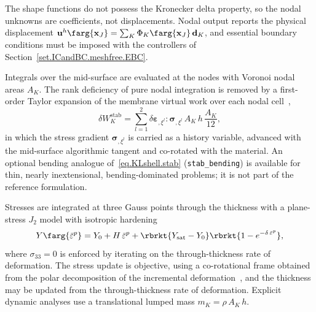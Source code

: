 The shape functions do not possess the Kronecker delta property, so the nodal unknowns are
coefficients, not displacements. Nodal output reports the physical displacement
$\mathbf{u}^{h}\farg{\mathbf{x}_{J}}=\sum_{K}\Phi_{K}\farg{\mathbf{x}_{J}}\,\mathbf{d}_{K}$,
and essential boundary conditions must be imposed with the controllers of
Section~\ref{set.ICandBC.meshfree.EBC}.

Integrals over the mid-surface are evaluated at the nodes with Voronoi nodal areas $A_{K}$. The
rank deficiency of pure nodal integration is removed by a first-order Taylor expansion of the
membrane virtual work over each nodal cell~\cite{WangBazilevs2025,Hillman2016},
\begin{equation}
\label{eq.KLshell.stab}
\delta W_{K}^{\textrm{stab}} = \sum_{l=1}^{2}
   \delta\boldsymbol{\varepsilon}_{,\xi^{l}} : \boldsymbol{\sigma}_{,\xi^{l}}\,
   A_{K}\,h\,\frac{A_{K}}{12},
\end{equation}
in which the stress gradient $\boldsymbol{\sigma}_{,\xi^{l}}$ is carried as a history variable,
advanced with the mid-surface algorithmic tangent and co-rotated with the material. An optional
bending analogue of~\eqref{eq.KLshell.stab} (\texttt{stab\_bending}) is available for thin,
nearly inextensional, bending-dominated problems; it is not part of the reference formulation.

Stresses are integrated at three Gauss points through the thickness with a plane-stress $J_{2}$
model with isotropic hardening
\begin{equation}
\label{eq.KLshell.hardening}
Y\farg{\bar\varepsilon^{p}} = Y_{0} + H\,\bar\varepsilon^{p}
   + \rbrkt{Y_{\textrm{sat}}-Y_{0}}\rbrkt{1-e^{-\delta\,\bar\varepsilon^{p}}},
\end{equation}
where $\sigma_{33}=0$ is enforced by iterating on the through-thickness rate of deformation. The
stress update is objective, using a co-rotational frame obtained from the polar decomposition of
the incremental deformation~\cite{Flanagan1987}, and the thickness may be updated from the
through-thickness rate of deformation. Explicit dynamic analyses use a translational lumped
mass $m_{K}=\rho\,A_{K}\,h$.

